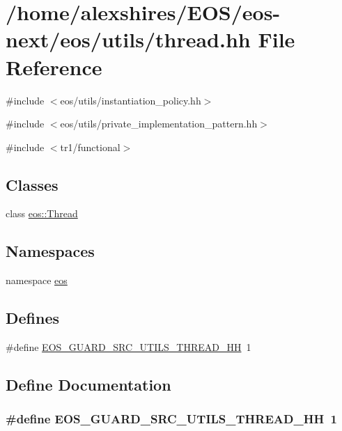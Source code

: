 \hypertarget{thread_8hh}{
\section{/home/alexshires/EOS/eos-\/next/eos/utils/thread.hh File Reference}
\label{thread_8hh}
}
{\ttfamily \#include $<$eos/utils/instantiation\_\-policy.hh$>$}\par
{\ttfamily \#include $<$eos/utils/private\_\-implementation\_\-pattern.hh$>$}\par
{\ttfamily \#include $<$tr1/functional$>$}\par
\subsection*{Classes}
\begin{DoxyCompactItemize}
\item 
class \hyperlink{classeos_1_1Thread}{eos::Thread}
\end{DoxyCompactItemize}
\subsection*{Namespaces}
\begin{DoxyCompactItemize}
\item 
namespace \hyperlink{namespaceeos}{eos}
\end{DoxyCompactItemize}
\subsection*{Defines}
\begin{DoxyCompactItemize}
\item 
\#define \hyperlink{thread_8hh_a2d7df5267d0afb72b9435a3e2ba9d252}{EOS\_\-GUARD\_\-SRC\_\-UTILS\_\-THREAD\_\-HH}~1
\end{DoxyCompactItemize}


\subsection{Define Documentation}
\hypertarget{thread_8hh_a2d7df5267d0afb72b9435a3e2ba9d252}{
\subsubsection[{EOS\_\-GUARD\_\-SRC\_\-UTILS\_\-THREAD\_\-HH}]{\setlength{\rightskip}{0pt plus 5cm}\#define EOS\_\-GUARD\_\-SRC\_\-UTILS\_\-THREAD\_\-HH~1}}
\label{thread_8hh_a2d7df5267d0afb72b9435a3e2ba9d252}
